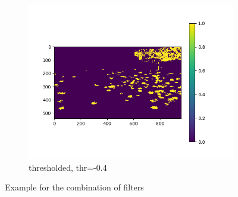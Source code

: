\documentclass[fleqn,10pt]{SelfArx} %
\begin{document}
\begin{figure}
\begin{subfigure}[b]{0.3\textwidth}
                \includegraphics[width=\linewidth]{Figures/Combi/res3.png}
                \caption{thresholded, thr=-0.4}
                \label{fig:CannyTile}
        \end{subfigure}
        \caption{Example for the combination of filters}
	 \label{fig:Res}
\end{figure}

\newpage



\end{document}
